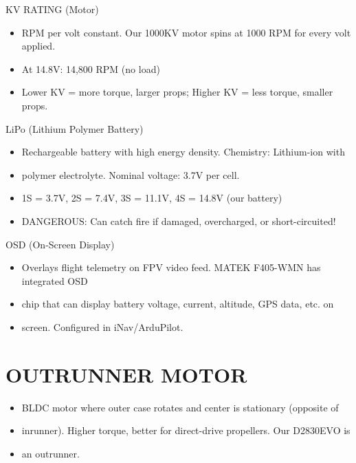 \documentclass[11pt,letterpaper]{article}
\begin{document}
KV RATING (Motor)\par

\begin{itemize}
  \item RPM per volt constant. Our 1000KV motor spins at 1000 RPM for every volt applied.
  \item At 14.8V: 14,800 RPM (no load)
  \item Lower KV = more torque, larger props; Higher KV = less torque, smaller props.
\end{itemize}

LiPo (Lithium Polymer Battery)\par

\begin{itemize}
  \item Rechargeable battery with high energy density. Chemistry: Lithium-ion with
  \item polymer electrolyte. Nominal voltage: 3.7V per cell.
  \item 1S = 3.7V, 2S = 7.4V, 3S = 11.1V, 4S = 14.8V (our battery)
  \item [WARNING] DANGEROUS: Can catch fire if damaged, overcharged, or short-circuited!
\end{itemize}

OSD (On-Screen Display)\par

\begin{itemize}
  \item Overlays flight telemetry on FPV video feed. MATEK F405-WMN has integrated OSD
  \item chip that can display battery voltage, current, altitude, GPS data, etc. on
  \item screen. Configured in iNav/ArduPilot.
\end{itemize}

\section{OUTRUNNER MOTOR}

\begin{itemize}
  \item BLDC motor where outer case rotates and center is stationary (opposite of
  \item inrunner). Higher torque, better for direct-drive propellers. Our D2830EVO is
  \item an outrunner.
\end{itemize}
\end{document}
